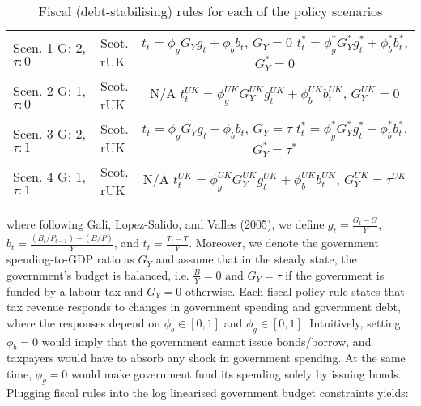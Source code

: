 \begin{table}[H]
    \renewcommand{\arraystretch}{2}
    \centering
    \begin{tabular}{l|l|c}
    \makecell{Scen. 1 \\ G: 2, $\tau: 0$} & \makecell{Scot. \\ rUK } & 
        \makecell{
            $t_t = \phi_g G_Y g_t + \phi_b b_t$, \quad $G_Y = 0$\\
            $t^*_t = \phi^*_g G^*_Y g^*_t + \phi^*_b b^*_t$, \quad $G^*_Y = 0$\\
        }  \\ 
    \makecell{Scen. 2 \\ G: 1, $\tau: 0$} & \makecell{Scot. \\ rUK } & 
        \makecell{
            N/A\\
            $t^{UK}_t = \phi^{UK}_g G^{UK}_Y g^{UK}_t + \phi^{UK}_b b^{UK}_t$, \quad $G^{UK}_Y = 0$\\
        }   \\ 
    \makecell{Scen. 3 \\ G: 2, $\tau: 1$} & \makecell{Scot. \\ rUK } & 
    \makecell{
        $t_t = \phi_g G_Y g_t + \phi_b b_t$, \quad $G_Y = \tau$\\
        $t^*_t = \phi^*_g G^*_Y g^*_t + \phi^*_b b^*_t$, \quad $G^*_Y = \tau^*$\\
}  \\
    \makecell{Scen. 4 \\ G: 1, $\tau: 1$} & \makecell{Scot. \\ rUK } & 
    \makecell{
        N/A \\
        $t^{UK}_t = \phi^{UK}_g G^{UK}_Y g^{UK}_t + \phi^{UK}_b b^{UK}_t$, \quad $G^{UK}_Y = \tau^{UK}$\\
        }  
    \end{tabular}
    \caption{Fiscal (debt-stabilising) rules for each of the policy scenarios}
\end{table}
where following Gali, Lopez-Salido, and Valles (2005), we define $g_t = \frac{G_t-G}{Y}$, $b_t = \frac{(B_t/P_{t-1}) - (B/P)}{Y}$, and $t_t = \frac{T_t - T}{Y}$. Moreover, we denote the government spending-to-GDP ratio as $G_Y$ and assume that in the steady state, the government's budget is balanced, i.e. $\frac{B}{Y} = 0$ and $G_Y = \tau$ if the government is funded by a labour tax and $G_Y=0$ otherwise. Each fiscal policy rule states that tax revenue responds to changes in government spending and government debt, where the responses depend on $\phi_b \in [0,1]$ and $\phi_g \in [0,1]$. Intuitively, setting $\phi_b = 0$ would imply that the government cannot issue bonds/borrow, and taxpayers would have to absorb any shock in government spending. At the same time, $\phi_g = 0$ would make government fund its spending solely by issuing bonds. Plugging fiscal rules into the log linearised government budget constraints yields:
